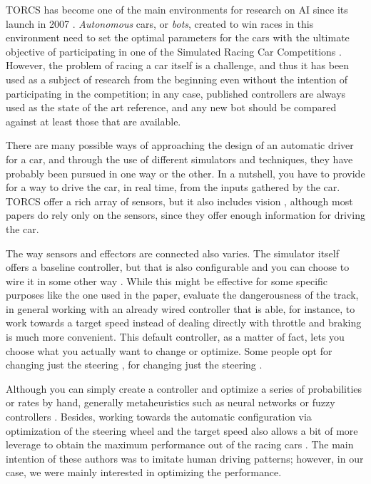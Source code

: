 \documentclass[conference]{IEEEtran}
\begin{document}
TORCS has become one of the
main environments for research on AI since its launch in 2007
\cite{torcs4}. {\em Autonomous} cars, or {\em bots}, created to win
races in this environment need to set the optimal parameters for the
cars \cite{Kole-ParamCarTunning12} with the ultimate objective of
participating in one of the Simulated Racing Car Competitions
\cite{SimulatedCarRacing-2008,SimulatedCarRacing-2010}. However, the
problem of racing a car itself is a challenge, and thus it has been used as a subject
of research from the beginning even without the intention of
participating in the competition; in any case, published controllers
are always used as the state of the art reference, and any new bot
should be compared against at least those that are available.

There are many possible ways of approaching the design of an automatic
driver for a car, and through the use of different simulators and
techniques, they have probably been pursued in one way or the
other. In a nutshell, you have to provide for a way to drive the car,
in real time, from the inputs gathered by the car. TORCS offer a rich
array of sensors, but it also includes vision  \cite{Floreano2004,zhu2018driving}, although most papers do
rely only on the sensors, since they offer enough information for
driving the car.

The way sensors and effectors are connected also varies. The simulator
itself offers a baseline controller, but that is also configurable and
you can choose to wire it in some other way
\cite{cussat2016dangerousness}. While this might be effective for some
specific purposes like the one used in the paper, evaluate the
dangerousness of the track, in general working with an already wired
controller that is able, for instance, to work towards a target speed
instead of dealing directly with throttle and braking is much more
convenient. This default controller, as a matter of fact, lets you
choose what you actually want to change or optimize. Some people opt for changing just the steering \cite{CarRacing_Pelta09},
for changing just the steering
\cite{CarRacing_Pelta09,Nikulin:2018:EAC:3205455.3205547,LFAG}.

Although you can simply create a controller and optimize a series of
probabilities or rates by hand, generally metaheuristics such as
neural networks \cite{zhu2018driving} or fuzzy controllers
\cite{armagan2017fuzzy}. Besides, working towards the automatic
configuration via optimization of the steering wheel and the target speed also allows a
bit of more leverage to obtain the maximum performance out of the
racing cars
\cite{CarRacing_Pelta09,PerezEvolvingFuzzy09,torcs2012}. The main
intention of these authors was to imitate human driving patterns;
however, in our case, we were mainly interested in optimizing the
performance.
\end{document}
